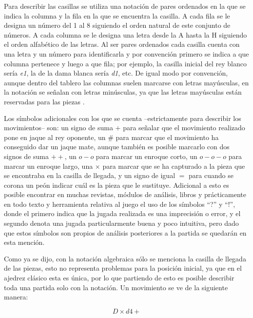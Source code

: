 \documentclass[twoside,openright,12pt,a4paper,spanish]{book}
\begin{document}
Para describir las casillas se utiliza una notación de pares ordenados en la que se indica la columna y la fila en la que se encuentra la casilla. A cada fila se le designa un número del 1 al 8 siguiendo el orden natural de este conjunto de números. A cada columna se le designa una letra desde la A hasta la H siguiendo el orden alfabético de las letras. Al ser pares ordenados cada casilla cuenta con una letra y un número para identificarla y por convención primero se indica a que columna pertenece y luego a que fila; por ejemplo, la casilla inicial del rey blanco sería \emph{e1}, la de la dama blanca sería \emph{d1}, etc. De igual modo por convención, aunque dentro del tablero las columnas suelen marcarse con letras mayúsculas, en la notación se señalan con letras minúsculas, ya que las letras mayúsculas están reservadas para las piezas \cite[p. 53]{feda_manual_2021}.

Los símbolos adicionales con los que se cuenta --estrictamente para describir los movimientos-- son: un signo de suma $+$ para señalar que el movimiento realizado pone en jaque al rey oponente, un $\#$ para marcar que el movimiento ha conseguido dar un jaque mate, aunque también es posible marcarlo con dos signos de suma $++$, un  $o-o$ para marcar un enroque corto, un $o-o-o$ para marcar un enroque largo, una $\times$ para marcar que se ha capturado a la pieza que se encontraba en la casilla de llegada, y un signo de igual $=$ para cuando se corona un peón indicar cuál es la pieza que le sustituye. Adicional a esto es posible encontrar en muchas revistas, módulos de análisis, libros y prácticamente en todo texto y herramienta relativa al juego el uso de los símbolos “?” y “!”, donde el primero indica que la jugada realizada es una imprecisión o error, y el segundo denota una jugada particularmente buena y poco intuitiva, pero dado que estos símbolos son propios de análisis posteriores a la partida se quedarán en esta mención.

Como ya se dijo, con la notación algebraica sólo se menciona la casilla de llegada de las piezas, esto no representa problemas para la posición inicial, ya que en el ajedrez clásico esta es única, por lo que partiendo de esto es posible describir toda una partida solo con la notación. Un movimiento se ve de la siguiente manera: 

  \Large\[D\times d4+\]
    
\end{document}
